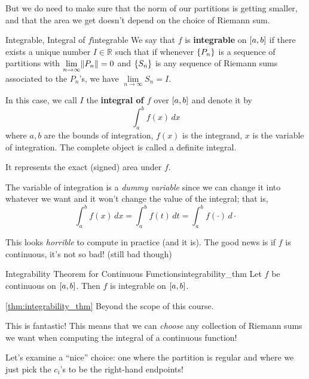 But we do need to make sure that the norm of our partitions is getting smaller,
and that the area we get doesn't depend on the choice of Riemann sum.

\begin{Definition}{Integrable, Integral of $ f $}{integrable}
    We say that $ f $ is \textbf{integrable} on $ \interval{a}{b} $ if there exists a unique number
    $ I\in\mathbb{R} $ such that if whenever $ \{P_n\} $ is a sequence of partitions with
    $ \lim\limits_{{n} \to {\infty}}\lVert P_n\rVert=0 $ and $ \{S_n\} $ is any sequence of
    Riemann sums associated to the $ P_n $'s, we have $ \lim\limits_{{n} \to {\infty}} S_n=I $.

    In this case, we call $ I $ the \textbf{integral of $ f $} over $ \interval{a}{b} $
    and denote it by
    \[ \int_{a}^{b} f(x)\, dx \]
    where $ a,b $ are the bounds of integration, $ f(x) $ is the integrand, $ x $ is the
    variable of integration. The complete object is called a definite integral.

    It represents the exact (signed) area under $ f $.
\end{Definition}

\begin{Remark}{}{}
    The variable of integration is a \emph{dummy variable} since we can change it into
    whatever we want and it won't change the value of the integral; that is,
    \[
        \int_{a}^{b} f(x)\,dx =
        \int_{a}^{b} f(t) \,d{t}=
        \int_{a}^{b} f(\cdot)\, d{\cdot}
    \]
\end{Remark}

This looks \emph{horrible} to compute in practice (and it is). The good news is if
$ f $ is continuous, it's not so bad! (still bad though)

\begin{Theorem}{Integrability Theorem for Continuous Functions}{integrability_thm}
    Let $ f $ be continuous on $ \interval{a}{b} $.
    Then $ f $ is integrable on $ \interval{a}{b} $.
\end{Theorem}

\begin{Proof}{\ref{thm:integrability_thm}}{}
    Beyond the scope of this course.
\end{Proof}

This is fantastic! This means that we can \emph{choose} any collection of Riemann sums
we want when computing the integral of a continuous function!

Let's examine a ``nice'' choice: one where the partition is regular and where we just
pick the $ c_i $'s to be the right-hand endpoints!

